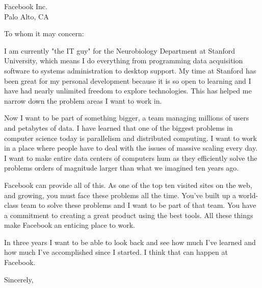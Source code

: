 \documentclass{letter}[11pt]
\begin{document}
\begin{letter}{Facebook Inc.\\
Palo Alto, CA
}

\opening{To whom it may concern:}

I am currently "the IT guy" for the Neurobiology Department at Stanford
University, which means I do everything from programming data acquisition
software to systems administration to desktop support.  My time at Stanford has been great
for my personal development because it is so open to learning and I have
had nearly unlimited freedom to explore technologies.  This has helped me
narrow down the problem areas I want to work in. 

Now I want to be part of something bigger, a team managing millions of users
and petabytes of data.  I have learned that one of the biggest problems in computer science today
is parallelism and distributed computing.  I want to work in a place where
people have to deal with the issues of massive scaling every day.  I want
to make entire data centers of computers hum as they efficiently solve the
problems orders of magnitude larger than what we imagined ten years ago.

Facebook can provide all of this.  As one of the top ten visited sites on
the web, and growing, you must face these problems all the time.  You've
built up a world-class team to solve these problems and I want to be part
of that team.  You have a commitment to creating a great product using the
best tools.  All these things make Facebook an enticing place to work.

In three years I want to be able to look back and see how much I've
learned and how much I've accomplished since I started.  I think that can
happen at Facebook.

\closing{Sincerely,}
\end{letter}
\end{document}
